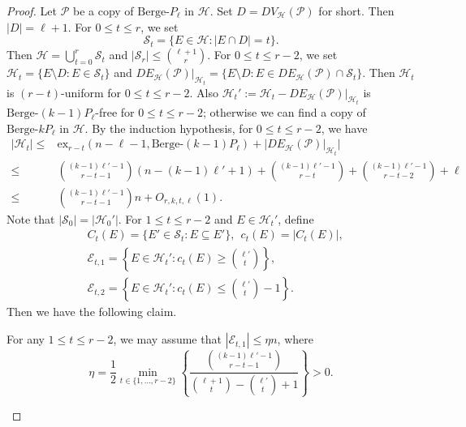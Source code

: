 \documentclass[10pt,a4paper]{amsart}
\newcommand{\ber}{\text{Berge-}}
\newcommand{\mh}{\mathcal{H}}
\begin{document}
 \begin{proof} Let $\mathcal{P}$ be  a copy of $\ber P_{\ell}$ in $\mh$. Set $D=DV_\mh(\mathcal{P})$ for short. Then $|D|=\ell+1$. For $0\le t\le r$, we set
         $$\mathcal{S}_t=\{E\in \mathcal{H}:|E\cap D|=t\}.$$
     Then $\mathcal{H}=\bigcup_{t=0}^{r}\mathcal{S}_t$ and $|\mathcal{S}_r|\leq \binom{\ell+1}{r}$.
     For $0\le t\le r-2$, we set $\mh_t=\{E\setminus D: E\in \mathcal{S}_t\}$ and $DE_\mh(\mathcal{P})|_{\mh_t}=\{E\setminus D: E\in DE_\mh(\mathcal{P})\cap \mathcal{S}_t\}$. Then $\mh_t$ is  $(r-t)$-uniform for $0\le t\le r-2$. Also $\mh_t':=\mh_t-DE_\mh(\mathcal{P})|_{\mh_t}$ is $\ber (k-1)P_{\ell}$-free for $0\le t\le r-2$; otherwise we can find a copy of $\ber kP_{\ell}$ in $\mh$.
    By the induction hypothesis, for $0\le t\le r-2$, we have
     \begin{equation}\label{lemm4-2}
         \begin{aligned}
             |\mh_t|\leq & \mathrm{ex}_{r-t}(n- \ell-1,\ber (k-1)P_{\ell})+|DE_\mh(\mathcal{P})|_{\mh_t}|\\
             \leq & \binom{(k-1)\ell'-1}{r-t-1}(n-(k-1)\ell'+1)+\binom{(k-1)\ell'-1}{r-t}+\binom{(k-1)\ell'-1}{r-t-2}+\ell\\
             \leq &  \binom{(k-1)\ell'-1}{r-t-1}n+O_{r,k,t,\ell}(1).
         \end{aligned}
     \end{equation}
    Note that    $|\mathcal{S}_0|=|\mh_0'|.$ For $1\le t\le r-2$ and $E\in \mh_t'$, define
          \begin{equation*}
         \begin{aligned}
         &C_t(E)=\{E'\in \mathcal{S}_t : E\subseteq E'\},~~c_t(E)=|C_t(E)|,\\
             &\mathcal{E}_{t,1}=\left\{E\in \mh_t' : c_t(E)\geq \binom{\ell'}{t}\right\},\\
             &\mathcal{E}_{t,2}=\left\{E\in \mh_t' : c_t(E)\leq \binom{\ell'}{t}-1\right\}.
         \end{aligned}
     \end{equation*}
     Then we have the following  claim.
     \begin{claim}\label{claim: et1 is small}
        For any $1\le t\le r-2$,  we may assume that $|\mathcal{E}_{t,1}|\leq \eta n$, where  $$ \eta=\frac{1}{2}\min_{t\in\{1,\ldots,r-2\}}\left\{\frac{\binom{(k-1)\ell'-1}{r-t-1}}{\binom{\ell+1}{t}-\binom{\ell'}{t}+1}\right\} >0.$$
     \end{claim}



\end{proof}
\end{document}

